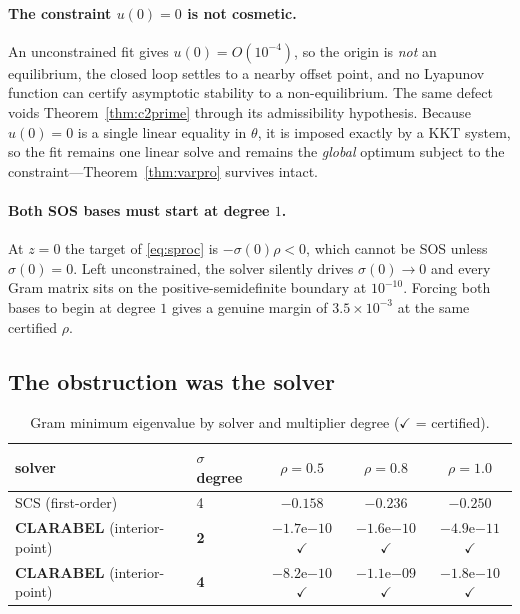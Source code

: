\documentclass[11pt]{article}
\theoremstyle{plain}
\theoremstyle{definition}
\begin{document}
\paragraph{The constraint $u(0)=0$ is not cosmetic.} An unconstrained fit gives
$u(0)=O(10^{-4})$, so the origin is \emph{not} an equilibrium, the closed loop
settles to a nearby offset point, and no Lyapunov function can certify
asymptotic stability to a non-equilibrium. The same defect voids
Theorem~\ref{thm:c2prime} through its admissibility hypothesis. Because $u(0)=0$
is a single linear equality in $\theta$, it is imposed exactly by a KKT system,
so the fit remains one linear solve and remains the \emph{global} optimum
subject to the constraint---Theorem~\ref{thm:varpro} survives intact.

\paragraph{Both SOS bases must start at degree $1$.} At $z=0$ the target of
\eqref{eq:sproc} is $-\sigma(0)\rho<0$, which cannot be SOS unless
$\sigma(0)=0$. Left unconstrained, the solver silently drives $\sigma(0)\to0$
and every Gram matrix sits on the positive-semidefinite boundary at $10^{-10}$.
Forcing both bases to begin at degree $1$ gives a genuine margin of
$3.5\times10^{-3}$ at the same certified $\rho$.

\subsection{The obstruction was the solver}

\begin{table}[t]
\centering
\caption{Gram minimum eigenvalue by solver and multiplier degree
($\checkmark$ = certified).}
\label{tab:solver}
\begin{tabular}{llccc}
\toprule
solver & $\sigma$ degree & $\rho=0.5$ & $\rho=0.8$ & $\rho=1.0$ \\
\midrule
SCS (first-order)        & 4 & $-0.158$ & $-0.236$ & $-0.250$ \\
\textbf{CLARABEL} (interior-point) & \textbf{2} & $-1.7$e$-10$ $\checkmark$ & $-1.6$e$-10$ $\checkmark$ & $-4.9$e$-11$ $\checkmark$ \\
\textbf{CLARABEL} (interior-point) & \textbf{4} & $-8.2$e$-10$ $\checkmark$ & $-1.1$e$-09$ $\checkmark$ & $-1.8$e$-10$ $\checkmark$ \\
\bottomrule
\end{tabular}
\end{table}
\end{document}
